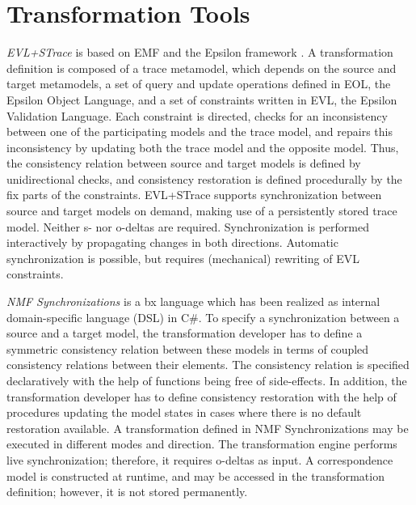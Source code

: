 \section{Transformation Tools}
\label{sec:TransformationTools}




\emph{EVL+STrace} \cite{IST2018-Samimi} is based on EMF and the Epsilon framework \cite{epsilon}. A transformation definition is composed of a trace metamodel, which depends on the source and target metamodels, a set of query and update operations defined in EOL, the Epsilon Object Language, and a set of constraints written in EVL, the Epsilon Validation Language. Each constraint is directed, checks for an inconsistency between one of the participating models and the trace model, and repairs this inconsistency by updating both the trace model and the opposite model. Thus, the consistency relation between source and target models is defined by unidirectional checks, and consistency restoration is defined procedurally by the fix parts of the constraints. EVL+STrace supports synchronization between source and target models on demand, making use of a persistently stored trace model. Neither s- nor o-deltas are required. Synchronization is performed interactively by propagating changes in both directions. Automatic synchronization is possible, but requires (mechanical) rewriting of EVL constraints. 


\emph{NMF Synchronizations} \cite{SoSyM2017-Hinkel} is a bx language which has been realized as internal domain-specific language (DSL) in C\#. To specify a synchronization between a source and a target model, the transformation developer has to define a symmetric consistency relation between these models in terms of coupled consistency relations between their elements. The consistency relation is specified declaratively with the help of functions being free of side-effects. In addition, the transformation developer has to define consistency restoration with the help of procedures updating the model states in cases where there is no default restoration available. A transformation defined in NMF Synchronizations may be executed in different modes and direction. The transformation engine performs live synchronization; therefore, it requires o-deltas as input. A correspondence model is constructed at runtime, and may be accessed in the transformation definition; however, it is not stored permanently.